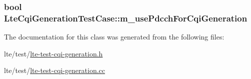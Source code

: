 \subsubsection[{\texorpdfstring{m\+\_\+use\+Pdcch\+For\+Cqi\+Generation}{m_usePdcchForCqiGeneration}}]{\setlength{\rightskip}{0pt plus 5cm}bool Lte\+Cqi\+Generation\+Test\+Case\+::m\+\_\+use\+Pdcch\+For\+Cqi\+Generation\hspace{0.3cm}{\ttfamily [private]}}\hypertarget{classLteCqiGenerationTestCase_a12fc45be07ab23b3a9e0805dc867f80c}{}\label{classLteCqiGenerationTestCase_a12fc45be07ab23b3a9e0805dc867f80c}


The documentation for this class was generated from the following files\+:\begin{DoxyCompactItemize}
\item 
lte/test/\hyperlink{lte-test-cqi-generation_8h}{lte-\/test-\/cqi-\/generation.\+h}\item 
lte/test/\hyperlink{lte-test-cqi-generation_8cc}{lte-\/test-\/cqi-\/generation.\+cc}\end{DoxyCompactItemize}
